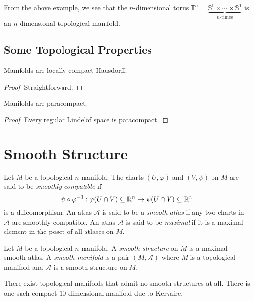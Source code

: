 From the above example, we see that the $n$-dimensional torus $\mathbb T^n = \underbrace{\mathbb S^1\times\cdots\times\mathbb S^1}_{n\text{-times}}$ is an $n$-dimensional topological manifold.

\subsection{Some Topological Properties}

\begin{lemma}
    Manifolds are locally compact Hausdorff.
\end{lemma}
\begin{proof}
    Straightforward.
\end{proof}

\begin{lemma}
    Manifolds are paracompact.
\end{lemma}
\begin{proof}
    Every regular Lindel\"of space is paracompact.
\end{proof}

\section{Smooth Structure}

\begin{definition}
    Let $M$ be a topological $n$-manifold. The charts $(U,\varphi)$ and $(V,\psi)$ on $M$ are said to be \emph{smoothly compatible} if 
    \begin{equation*}
        \psi\circ\varphi^{-1}:\varphi(U\cap V)\subseteq\mathbb{R}^n\to\psi(U\cap V)\subseteq\mathbb{R}^n
    \end{equation*}
    is a diffeomorphism. An atlas $\mathscr A$ is said to be a \emph{smooth atlas} if any two charts in $\mathscr A$ are smoothly compatible. An atlas $\mathscr A$ is said to be \emph{maximal} if it is a maximal element in the poset of all atlases on $M$.
\end{definition}


\begin{definition}
    Let $M$ be a topological $n$-manifold. A \emph{smooth structure} on $M$ is a maximal smooth atlas. A \emph{smooth manifold} is a pair $(M,\mathscr A)$ where $M$ is a topological manifold and $\mathscr A$ is a smooth structure on $M$.
\end{definition}

\begin{remark}
    There exist topological manifolds that admit no smooth structures at all. There is one such compact $10$-dimensional manifold due to Kervaire.
\end{remark}

